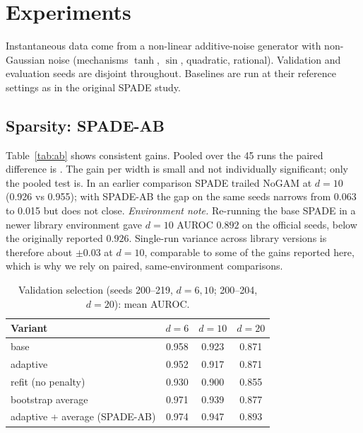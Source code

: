 \documentclass[11pt]{article}
\begin{document}
\section{Experiments}
Instantaneous data come from a non-linear additive-noise generator with non-Gaussian noise (mechanisms
$\tanh$, $\sin$, quadratic, rational). Validation and evaluation seeds are disjoint throughout. Baselines are
run at their reference settings as in the original SPADE study.

\subsection{Sparsity: SPADE-AB}
\begin{table}[t]\centering\small
\caption{Fresh seeds (300--319 for $d=6,10$; 300--304 for $d=20$): instantaneous-DAG recovery.}
\label{tab:ab}

\end{table}
Table~\ref{tab:ab} shows consistent gains. Pooled over the 45 runs the paired difference is
. The gain per width is small and
not individually significant; only the pooled test is. In an earlier comparison SPADE trailed NoGAM at
$d=10$ (0.926 vs 0.955); with SPADE-AB the gap on the same seeds narrows from 0.063 to 0.015 but does not close.
\emph{Environment note.} Re-running the base SPADE in a newer library environment gave $d=10$ AUROC $0.892$ on the
official seeds, below the originally reported $0.926$. Single-run variance across library versions is therefore
about $\pm0.03$ at $d=10$, comparable to some of the gains reported here, which is why we rely on paired,
same-environment comparisons.

\begin{table}[t]\centering\small
\caption{Validation selection (seeds 200--219, $d=6,10$; 200--204, $d=20$): mean AUROC.}
\label{tab:valsel}
\begin{tabular}{lccc}\toprule Variant & $d{=}6$ & $d{=}10$ & $d{=}20$\\\midrule
base & 0.958 & 0.923 & 0.871\\ adaptive & 0.952 & 0.917 & 0.871\\ refit (no penalty) & 0.930 & 0.900 & 0.855\\
bootstrap average & 0.971 & 0.939 & 0.877\\ adaptive + average (SPADE-AB) & 0.974 & 0.947 & 0.893\\\bottomrule\end{tabular}
\end{table}
\end{document}
